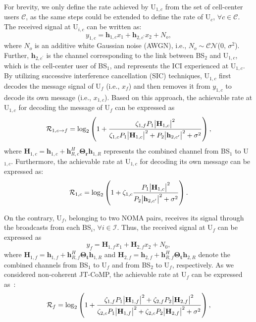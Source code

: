\documentclass[conference]{IEEEtran}
\begin{document}
For brevity, we only define the rate achieved by U$_{1,c}$ from the set of cell-center users $\mathcal{C}$, as the same steps could be extended to define the rate of U$_c$, $\forall c \in \mathcal{C}$. The received signal at U$_{i,c}$ can be written as:
\begin{equation}
    y_{1,c}=\textbf{h}_{1,c}x_1 + \textbf{h}_{2,c^\prime} x_2 + N_o,
\end{equation}
where $N_o$ is an additive white Gaussian noise (AWGN), i.e., $N_o\sim \mathcal{CN}$(0, $\sigma^2$). Further, $\textbf{h}_{2,c^\prime}$ is the channel corresponding to the link between BS$_2$ and U$_{1,c}$, which is the cell-center user of BS$_1$, and represents the ICI experienced at U$_{1,c}$. By utilizing successive interference cancellation (SIC) techniques, U$_{1,c}$ first decodes the message signal of U$_f$ (i.e., $x_f$) and then removes it from $y_{1,c}$ to decode its own message (i.e., $x_{1,c}$). Based on this approach, the achievable rate at U$_{1,c}$ for decoding the message of U$_f$ can be expressed as
\begin{equation}
    \mathcal{R}_{1,c\rightarrow f}=\log_2\left(1+\frac{\zeta_{1,f}P_1\abs{\textbf{H}_{1, c}}^2}{\zeta_{1,c}P_1\abs{\textbf{H}_{1, c}}^2 + P_2\abs{\textbf{h}_{2,c^\prime}}^2 +  \sigma^2}\right),
\end{equation}
where $\textbf{H}_{1, c}=\textbf{h}_{1, c}+\textbf{h}_{R, c}^H \mathbf{\Theta_r}\textbf{h}_{1, R}$ represents the combined channel from BS$_1$ to U$_{1,c}$. Furthermore, the achievable rate at U$_{1,c}$ for decoding its own message can be expressed as:
\begin{equation}
    \mathcal{R}_{1,c}=\log_2\left(1+\zeta_{1,c}\frac{P_1\abs{\textbf{H}_{1, c}}^2}{P_2\abs{\textbf{h}_{2,c^\prime}}^2 + \sigma^2}\right).
\end{equation}

On the contrary, U$_f$, belonging to two NOMA pairs, receives its signal through the broadcasts from each BS$_i$, $\forall i \in \mathcal{I}$. Thus, the received signal at U$_f$ can be expressed as
\begin{equation}
    y_f = \textbf{H}_{1, f}x_1 + \textbf{H}_{2, f}x_2 + N_0,
\end{equation}
where $\textbf{H}_{1, f}=\textbf{h}_{1, f}+\textbf{h}_{R, f}^H \mathbf{\Theta_t}\textbf{h}_{1, R}$ and $\textbf{H}_{2, f}=\textbf{h}_{2, f}+\textbf{h}_{R, f}^H \mathbf{\Theta_t}\textbf{h}_{2, R}$ denote the combined channels from BS$_1$ to U$_f$ and from BS$_2$ to U$_f$, respectively. As we considered non-coherent JT-CoMP, the achievable rate at U$_f$ can be expressed as~\cite{tanbourgi2014tractable, elhattab2022ris}:
\begin{equation}
    \mathcal{R}_{f}=\log_2\left(1 + \frac{\zeta_{1,f}P_1\abs{\textbf{H}_{1, f}}^2 + \zeta_{2,f}P_2\abs{\textbf{H}_{2, f}}^2}{\zeta_{2,c}P_1\abs{\textbf{H}_{1, f}}^2 + \zeta_{2,c}P_2\abs{\textbf{H}_{2, f}}^2 + \sigma^2}\right),
\end{equation}
\end{document}
